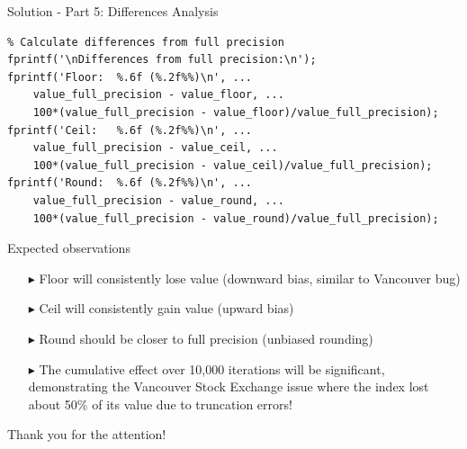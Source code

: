\documentclass[aspectratio=169]{beamer}
\begin{document}
\begin{frame}[fragile]{Solution - Part 5: Differences Analysis}
    \begin{verbatim}
% Calculate differences from full precision
fprintf('\nDifferences from full precision:\n');
fprintf('Floor:  %.6f (%.2f%%)\n', ...
    value_full_precision - value_floor, ...
    100*(value_full_precision - value_floor)/value_full_precision);
fprintf('Ceil:   %.6f (%.2f%%)\n', ...
    value_full_precision - value_ceil, ...
    100*(value_full_precision - value_ceil)/value_full_precision);
fprintf('Round:  %.6f (%.2f%%)\n', ...
    value_full_precision - value_round, ...
    100*(value_full_precision - value_round)/value_full_precision);
    \end{verbatim}
\end{frame}

\begin{frame}{Expected observations}
    \begin{itemize}
        \item[$\blacktriangleright$]
        Floor will consistently lose value (downward bias, similar to Vancouver bug)

        \item[$\blacktriangleright$]
        Ceil will consistently gain value (upward bias)

        \item[$\blacktriangleright$]
        Round should be closer to full precision (unbiased rounding)
    
        \item[$\blacktriangleright$]
        The cumulative effect over 10,000 iterations will be significant, demonstrating the Vancouver Stock Exchange issue where the index lost about 50\% of its value due to truncation errors!
    \end{itemize}
\end{frame}

{
    \begin{frame}[standout]
        Thank you for the attention!
    \end{frame}
}
\end{document}
